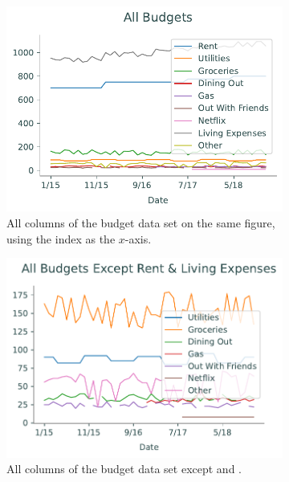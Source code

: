 \begin{figure}[H] %
\captionsetup[subfigure]{justification=centering}
\centering
\begin{subfigure}{.49\textwidth}
    \includegraphics[width=\textwidth]{figures/all_budget.pdf}
    \caption{All columns of the budget data set on the same figure, using the index as the $x$-axis.}
    \label{fig:budget-all}
\end{subfigure}
%
\begin{subfigure}{.49\textwidth}
    \includegraphics[width=\textwidth]{figures/all_budget2.pdf}
    \caption{All columns of the budget data set except  and .}
    \label{fig:budget-all-v2}
\end{subfigure}
\caption{}
\end{figure}

